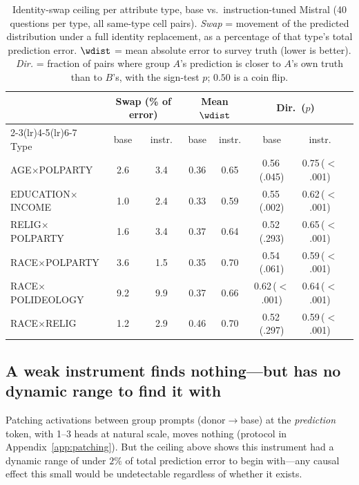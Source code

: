 \begin{table}[t]
\centering\small
\setlength{\tabcolsep}{5pt}
\caption{Identity-swap ceiling per attribute type, base vs.\
instruction-tuned Mistral (40 questions per type, all same-type cell
pairs). \emph{Swap} = movement of the predicted distribution under a full
identity replacement, as a percentage of that type's total prediction
error. $\wdist$ = mean absolute error to survey truth (lower is better).
\emph{Dir.} = fraction of pairs where group $A$'s prediction is closer to
$A$'s own truth than to $B$'s, with the sign-test $p$; $0.50$ is a coin
flip.}
\label{tab:ceiling}
\begin{tabular}{lccccccc}
\toprule
& \multicolumn{2}{c}{Swap (\% of error)} & \multicolumn{2}{c}{Mean $\wdist$}
& \multicolumn{2}{c}{Dir.\ ($p$)}\\
\cmidrule(lr){2-3}\cmidrule(lr){4-5}\cmidrule(lr){6-7}
Type & base & instr. & base & instr. & base & instr.\\
\midrule
AGE$\times$POLPARTY & 2.6 & 3.4 & 0.36 & 0.65 & 0.56\,(.045) & 0.75\,($<$.001) \\
EDUCATION$\times$INCOME & 1.0 & 2.4 & 0.33 & 0.59 & 0.55\,(.002) & 0.62\,($<$.001) \\
RELIG$\times$POLPARTY & 1.6 & 3.4 & 0.37 & 0.64 & 0.52\,(.293) & 0.65\,($<$.001) \\
RACE$\times$POLPARTY & 3.6 & 1.5 & 0.35 & 0.70 & 0.54\,(.061) & 0.59\,($<$.001) \\
RACE$\times$POLIDEOLOGY & 9.2 & 9.9 & 0.37 & 0.66 & 0.62\,($<$.001) & 0.64\,($<$.001) \\
RACE$\times$RELIG & 1.2 & 2.9 & 0.46 & 0.70 & 0.52\,(.297) & 0.59\,($<$.001) \\
\bottomrule
\end{tabular}
\end{table}

\subsection{A weak instrument finds nothing---but has no dynamic range to find it with}
\label{sec:weakinstrument}
Patching \starhead{} activations between group prompts (donor$\to$base) at
the \emph{prediction} token, with 1--3 heads at natural scale, moves
nothing (protocol in Appendix~\ref{app:patching}). But the ceiling above
shows this instrument had a dynamic range of under $2\%$ of total
prediction error to begin with---any causal effect this small would be
undetectable regardless of whether it exists.

